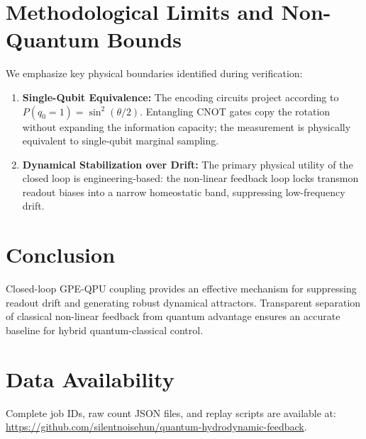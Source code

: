 \documentclass[11pt,a4paper]{article}
\begin{document}
\section{Methodological Limits and Non-Quantum Bounds}
We emphasize key physical boundaries identified during verification:
\begin{enumerate}
  \item \textbf{Single-Qubit Equivalence:} The encoding circuits project according to $P(q_0=1) = \sin^2(\theta/2)$. Entangling CNOT gates copy the rotation without expanding the information capacity; the measurement is physically equivalent to single-qubit marginal sampling.
  \item \textbf{Dynamical Stabilization over Drift:} The primary physical utility of the closed loop is engineering-based: the non-linear feedback loop locks transmon readout biases into a narrow homeostatic band, suppressing low-frequency drift.
\end{enumerate}

\section{Conclusion}
Closed-loop GPE-QPU coupling provides an effective mechanism for suppressing readout drift and generating robust dynamical attractors. Transparent separation of classical non-linear feedback from quantum advantage ensures an accurate baseline for hybrid quantum-classical control.

\section*{Data Availability}
Complete job IDs, raw count JSON files, and replay scripts are available at: \url{https://github.com/silentnoisehun/quantum-hydrodynamic-feedback}.
\end{document}

